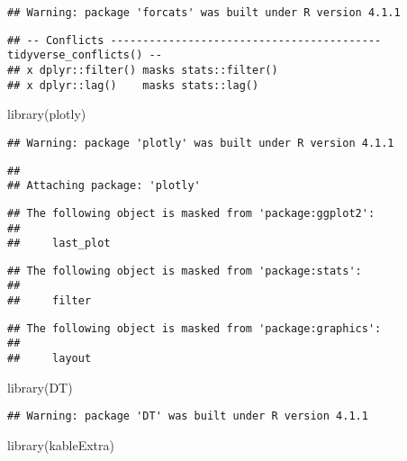 \documentclass[
]{article}
\newenvironment{Shaded}{\begin{snugshade}}{\end{snugshade}}
\newcommand{\FunctionTok}[1]{\textcolor[rgb]{0.00,0.00,0.00}{#1}}
\newcommand{\NormalTok}[1]{#1}
\begin{document}
\begin{verbatim}
## Warning: package 'forcats' was built under R version 4.1.1
\end{verbatim}

\begin{verbatim}
## -- Conflicts ------------------------------------------ tidyverse_conflicts() --
## x dplyr::filter() masks stats::filter()
## x dplyr::lag()    masks stats::lag()
\end{verbatim}

\begin{Shaded}
\begin{Highlighting}[]
\FunctionTok{library}\NormalTok{(plotly)}
\end{Highlighting}
\end{Shaded}

\begin{verbatim}
## Warning: package 'plotly' was built under R version 4.1.1
\end{verbatim}

\begin{verbatim}
## 
## Attaching package: 'plotly'
\end{verbatim}

\begin{verbatim}
## The following object is masked from 'package:ggplot2':
## 
##     last_plot
\end{verbatim}

\begin{verbatim}
## The following object is masked from 'package:stats':
## 
##     filter
\end{verbatim}

\begin{verbatim}
## The following object is masked from 'package:graphics':
## 
##     layout
\end{verbatim}

\begin{Shaded}
\begin{Highlighting}[]
\FunctionTok{library}\NormalTok{(DT)}
\end{Highlighting}
\end{Shaded}

\begin{verbatim}
## Warning: package 'DT' was built under R version 4.1.1
\end{verbatim}

\begin{Shaded}
\begin{Highlighting}[]
\FunctionTok{library}\NormalTok{(kableExtra)}
\end{Highlighting}
\end{Shaded}
\end{document}
